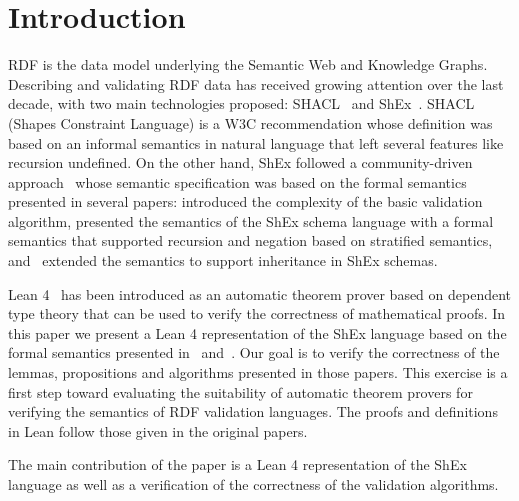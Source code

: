 \section{Introduction} \label{sec:introduction}

RDF is the data model underlying the Semantic Web and Knowledge Graphs.
 Describing and validating RDF data has received growing attention
 over the last decade, with two main technologies proposed:
   SHACL~\cite{SHACL} and ShEx~\cite{PGS14}.
 SHACL (Shapes Constraint Language) is a W3C recommendation whose definition
  was based on an informal semantics in natural language that left several features like recursion undefined.
 On the other hand, ShEx followed a community-driven approach~\cite{shex_standard} 
  whose semantic specification was based  
  on the formal semantics presented in several papers:
  \cite{SBG15} introduced the complexity of the basic validation algorithm, 
  \cite{BGP17} presented the semantics of the ShEx schema language 
   with a formal semantics that supported recursion and negation 
   based on stratified semantics, 
   and~\cite{ShExInheritance} 
   extended the semantics to support inheritance in ShEx schemas.

 Lean 4~\cite{Moura2021} has been introduced as an automatic theorem prover based on dependent type theory
   that can be used to verify the correctness of mathematical proofs.
 In this paper we present a Lean 4 representation of the ShEx
   language based on the formal semantics presented in~\cite{BGP17} and~\cite{ShExInheritance}.
 Our goal is to verify the correctness of the lemmas, propositions and algorithms presented in those papers.
 This exercise is a first step toward evaluating the suitability of automatic theorem provers
 for verifying the semantics of RDF validation languages.
 The proofs and definitions in Lean follow those given in the original papers.
 
 The main contribution of the paper is a Lean 4 representation of the ShEx language as well as a verification of the 
  correctness of the validation algorithms.
 
